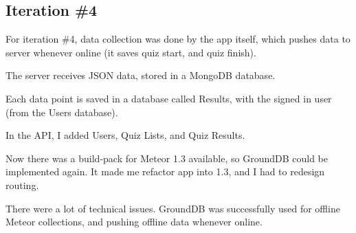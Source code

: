 \subsection{Iteration \#4}

For iteration \#4, data collection was done by the app itself, which pushes data to server whenever online (it saves quiz start, and quiz finish).

The server receives JSON data, stored in a MongoDB database.

Each data point is saved in a database called Results, with the signed in user (from the Users database).

In the API, I added Users, Quiz Lists, and Quiz Results.

Now there was a build-pack for Meteor 1.3 available, so GroundDB could be implemented again. It made me refactor app into 1.3, and I had to redesign routing.

There were a lot of technical issues. GroundDB was successfully used for offline Meteor collections, and pushing offline data whenever online.
